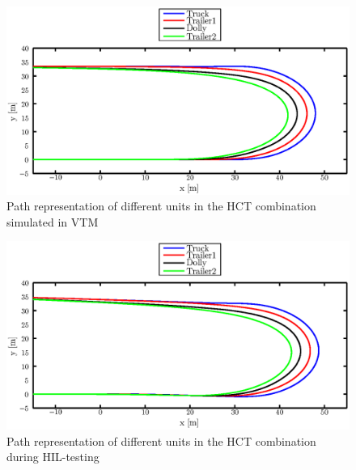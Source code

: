 \documentclass[ExampleMasters.tex]{subfiles}
\begin{document}
\begin{figure}[!htb]
	\centering
	\includegraphics[width=1\linewidth]{figures/xy_VTM}
	\caption{Path representation of different units in the \gls{HCT} combination simulated in VTM}
	
	\label{fig:xy_VTM}
\end{figure}
\begin{figure}[!htb]
	\centering
	\includegraphics[width=1\linewidth]{figures/xy_HIL}
	\caption{Path representation of different units in the \gls{HCT} combination during \gls{HIL}-testing}
	
	\label{fig:xy_HIL}
\end{figure}  
 

  
  
 
\end{document}
